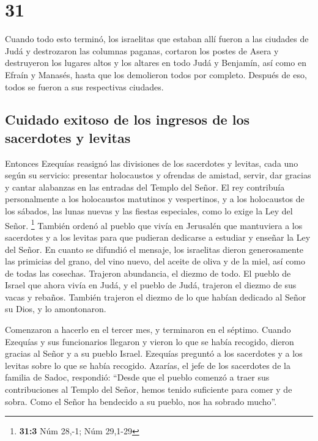 \hypertarget{section-30}{%
\section{31}\label{section-30}}

 Cuando todo esto terminó, los israelitas que estaban allí
fueron a las ciudades de Judá y destrozaron las columnas paganas,
cortaron los postes de Asera y destruyeron los lugares altos y los
altares en todo Judá y Benjamín, así como en Efraín y Manasés, hasta que
los demolieron todos por completo. Después de eso, todos se fueron a sus
respectivas ciudades.

\hypertarget{cuidado-exitoso-de-los-ingresos-de-los-sacerdotes-y-levitas}{%
\subsection{Cuidado exitoso de los ingresos de los sacerdotes y
levitas}\label{cuidado-exitoso-de-los-ingresos-de-los-sacerdotes-y-levitas}}

 Entonces Ezequías reasignó las divisiones de los
sacerdotes y levitas, cada uno según su servicio: presentar holocaustos
y ofrendas de amistad, servir, dar gracias y cantar alabanzas en las
entradas del Templo del Señor.  El rey contribuía
personalmente a los holocaustos matutinos y vespertinos, y a los
holocaustos de los sábados, las lunas nuevas y las fiestas especiales,
como lo exige la Ley del Señor. \footnote{\textbf{31:3} Núm 28,-1; Núm
  29,1-29}  También ordenó al pueblo que vivía en
Jerusalén que mantuviera a los sacerdotes y a los levitas para que
pudieran dedicarse a estudiar y enseñar la Ley del Señor. 
En cuanto se difundió el mensaje, los israelitas dieron generosamente
las primicias del grano, del vino nuevo, del aceite de oliva y de la
miel, así como de todas las cosechas. Trajeron abundancia, el diezmo de
todo.  El pueblo de Israel que ahora vivía en Judá, y el
pueblo de Judá, trajeron el diezmo de sus vacas y rebaños. También
trajeron el diezmo de lo que habían dedicado al Señor su Dios, y lo
amontonaron.

 Comenzaron a hacerlo en el tercer mes, y terminaron en el
séptimo.  Cuando Ezequías y sus funcionarios llegaron y
vieron lo que se había recogido, dieron gracias al Señor y a su pueblo
Israel.  Ezequías preguntó a los sacerdotes y a los
levitas sobre lo que se había recogido.  Azarías, el jefe
de los sacerdotes de la familia de Sadoc, respondió: ``Desde que el
pueblo comenzó a traer sus contribuciones al Templo del Señor, hemos
tenido suficiente para comer y de sobra. Como el Señor ha bendecido a su
pueblo, nos ha sobrado mucho''.

